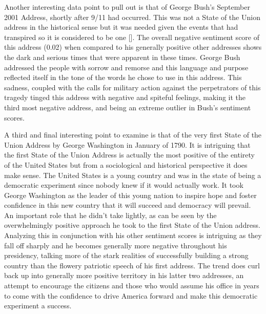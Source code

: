 Another interesting data point to pull out is that of George Bush's September 2001 Address, shortly after 9/11 had occurred.
This was not a State of the Union address in the historical sense but it was needed given the events that had transpired so it is considered to be one [\cite{bush2001911}].
The overall negative sentiment score of this address (0.02) when compared to his generally positive other addresses shows the dark and serious times that were apparent in these times.
George Bush addressed the people with sorrow and remorse and this language and purpose reflected itself in the tone of the words he chose to use in this address.
This sadness, coupled with the calls for military action against the perpetrators of this tragedy tinged this address with negative and spiteful feelings, making it the third most negative address, and being an extreme outlier in Bush's sentiment scores.

A third and final interesting point to examine is that of the very first State of the Union Address by George Washington in January of 1790.
It is intriguing that the first State of the Union Address is actually the most positive of the entirety of the United States but from a sociological and historical perspective it does make sense.
The United States is a young country and was in the state of being a democratic experiment since nobody knew if it would actually work.
It took George Washington as the leader of this young nation to inspire hope and foster confidence in this new country that it will succeed and democracy will prevail.
An important role that he didn't take lightly, as can be seen by the overwhelmingly positive approach he took to the first State of the Union address.
Analyzing this in conjunction with his other sentiment scores is intriguing as they fall off sharply and he becomes generally more negative throughout his presidency, talking more of the stark realities of successfully building a strong country than the flowery patriotic speech of his first address.
The trend does curl back up into generally more positive territory in his latter two addresses, an attempt to encourage the citizens and those who would assume his office in years to come with the confidence to drive America forward and make this democratic experiment a success.